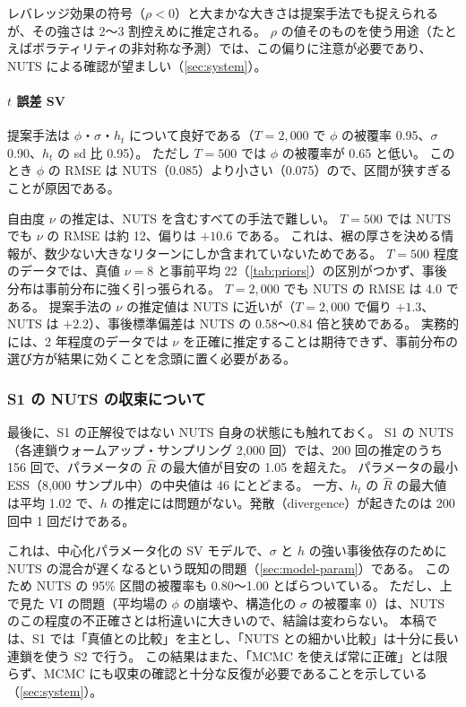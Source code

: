 レバレッジ効果の符号（$\rho < 0$）と大まかな大きさは提案手法でも捉えられるが、その強さは 2〜3 割控えめに推定される。
$\rho$ の値そのものを使う用途（たとえばボラティリティの非対称な予測）では、この偏りに注意が必要であり、NUTS による確認が望ましい（\cref{sec:system}）。

\paragraph{$t$ 誤差 SV}
提案手法は $\phi$・$\sigma$・$h_t$ について良好である（$T = 2{,}000$ で $\phi$ の被覆率 0.95、$\sigma$ 0.90、$h_t$ の sd 比 0.95）。
ただし $T = 500$ では $\phi$ の被覆率が 0.65 と低い。
このとき $\phi$ の RMSE は NUTS（0.085）より小さい（0.075）ので、区間が狭すぎることが原因である。

自由度 $\nu$ の推定は、NUTS を含むすべての手法で難しい。
$T = 500$ では NUTS でも $\nu$ の RMSE は約 12、偏りは $+10.6$ である。
これは、裾の厚さを決める情報が、数少ない大きなリターンにしか含まれていないためである。
$T = 500$ 程度のデータでは、真値 $\nu = 8$ と事前平均 22（\cref{tab:priors}）の区別がつかず、事後分布は事前分布に強く引っ張られる。
$T = 2{,}000$ でも NUTS の RMSE は 4.0 である。
提案手法の $\nu$ の推定値は NUTS に近いが（$T = 2{,}000$ で偏り $+1.3$、NUTS は $+2.2$）、事後標準偏差は NUTS の 0.58〜0.84 倍と狭めである。
実務的には、2 年程度のデータでは $\nu$ を正確に推定することは期待できず、事前分布の選び方が結果に効くことを念頭に置く必要がある。

\subsubsection{S1 の NUTS の収束について}

最後に、S1 の正解役ではない NUTS 自身の状態にも触れておく。
S1 の NUTS（各連鎖ウォームアップ・サンプリング 2,000 回）では、200 回の推定のうち 156 回で、パラメータの $\hat R$ の最大値が目安の 1.05 を超えた。
パラメータの最小 ESS（8,000 サンプル中）の中央値は 46 にとどまる。
一方、$h_t$ の $\hat R$ の最大値は平均 1.02 で、$h$ の推定には問題がない。発散（divergence）が起きたのは 200 回中 1 回だけである。

これは、中心化パラメータ化の SV モデルで、$\sigma$ と $h$ の強い事後依存のために NUTS の混合が遅くなるという既知の問題（\cref{sec:model-param}）である。
このため NUTS の 95\% 区間の被覆率も 0.80〜1.00 とばらついている。
ただし、上で見た VI の問題（平均場の $\phi$ の崩壊や、構造化の $\sigma$ の被覆率 0）は、NUTS のこの程度の不正確さとは桁違いに大きいので、結論は変わらない。
本稿では、S1 では「真値との比較」を主とし、「NUTS との細かい比較」は十分に長い連鎖を使う S2 で行う。
この結果はまた、「MCMC を使えば常に正確」とは限らず、MCMC にも収束の確認と十分な反復が必要であることを示している（\cref{sec:system}）。

